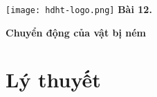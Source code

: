 \newcommand{\chapter}[2][]{
	\newcommand{\chapname}{#2}
	\begin{flushleft}
		\begin{minipage}[t]{\linewidth}
			\texttt{[image: hdht-logo.png]}
			\hspace{0pt}	
			\sffamily\bfseries\large Bài  12.
			\begin{flushleft}
				\LARGE\bfseries #1
			\end{flushleft}
		\end{minipage}
	\end{flushleft}
	\vspace{1cm}
	\normalfont\normalsize
}
\chapter[Chuyển động của vật bị ném]{Chuyển động của vật bị ném}
\section{Lý thuyết}
